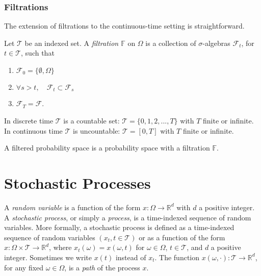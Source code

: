 \documentclass[\topdir/lecture\_notes.tex]{subfiles}
\begin{document}
\subsubsection*{Filtrations}

The extension of filtrations to the continuous-time setting is straightforward.
\begin{defn}\label{defn:filtration}
Let $\mathcal{T}$ be an indexed set. A \emph{filtration $\mathbb{F}$} on $\Omega$ is a collection of $\sigma$-algebras $\mathcal{F}_{t}$, for $t \in \mathcal{T}$, such that
\begin{enumerate}
    \item $\mathcal{F}_{0}=\{\emptyset, \Omega\}$
    \item $\forall s>t, \quad \mathcal{F}_{t} \subset \mathcal{F}_{s}$
    \item $\mathcal{F}_{T}=\mathcal{F}$.
\end{enumerate}
\end{defn}
In discrete time $\mathcal{T}$ is a countable set: $\mathcal{T}=\{0,1,2,..., T\}$ with $T$ finite or infinite. In continuous time $\mathcal{T}$ is uncountable: $\mathcal{T}=[0,T]$ with $T$ finite or infinite.

\begin{defn}
A filtered probability space is a probability space with a filtration $\mathbb{F}$. 
\end{defn}


\section{Stochastic Processes}

A \emph{random variable} is a function of the form $x: \Omega \rightarrow \mathbb{R}^d$ with $d$ a positive integer. A \emph{stochastic process}, or simply a \emph{process}, is a time-indexed sequence of random variables. More formally, a stochastic process is defined as a time-indexed sequence of random variables $(x_{t}, t\in\mathcal{T})$ or as a function of the form $x: \Omega \times\mathcal{T} \rightarrow \mathbb{R}^d$, where $x_{t}(\omega)=x(\omega, t)$ for $\omega \in \Omega$, $t \in\mathcal{T}$, and $d$ a positive integer. Sometimes we write $x(t)$ instead of $x_{t}$. The function $x(\omega, \cdot):\mathcal{T} \rightarrow \mathbb{R}^d$, for any fixed $\omega \in \Omega$, is a \emph{path} of the process $x$.
\end{document}
